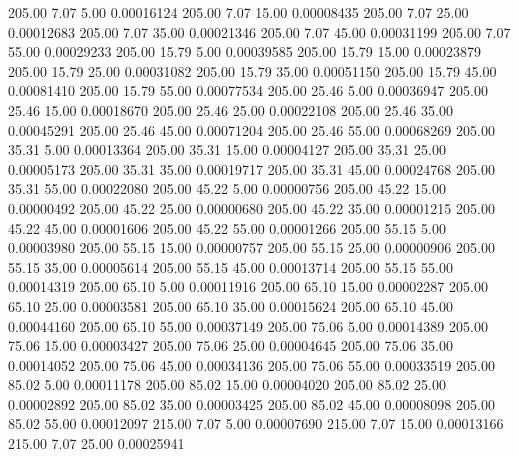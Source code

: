     205.00      7.07      5.00     0.00016124
    205.00      7.07     15.00     0.00008435
    205.00      7.07     25.00     0.00012683
    205.00      7.07     35.00     0.00021346
    205.00      7.07     45.00     0.00031199
    205.00      7.07     55.00     0.00029233
    205.00     15.79      5.00     0.00039585
    205.00     15.79     15.00     0.00023879
    205.00     15.79     25.00     0.00031082
    205.00     15.79     35.00     0.00051150
    205.00     15.79     45.00     0.00081410
    205.00     15.79     55.00     0.00077534
    205.00     25.46      5.00     0.00036947
    205.00     25.46     15.00     0.00018670
    205.00     25.46     25.00     0.00022108
    205.00     25.46     35.00     0.00045291
    205.00     25.46     45.00     0.00071204
    205.00     25.46     55.00     0.00068269
    205.00     35.31      5.00     0.00013364
    205.00     35.31     15.00     0.00004127
    205.00     35.31     25.00     0.00005173
    205.00     35.31     35.00     0.00019717
    205.00     35.31     45.00     0.00024768
    205.00     35.31     55.00     0.00022080
    205.00     45.22      5.00     0.00000756
    205.00     45.22     15.00     0.00000492
    205.00     45.22     25.00     0.00000680
    205.00     45.22     35.00     0.00001215
    205.00     45.22     45.00     0.00001606
    205.00     45.22     55.00     0.00001266
    205.00     55.15      5.00     0.00003980
    205.00     55.15     15.00     0.00000757
    205.00     55.15     25.00     0.00000906
    205.00     55.15     35.00     0.00005614
    205.00     55.15     45.00     0.00013714
    205.00     55.15     55.00     0.00014319
    205.00     65.10      5.00     0.00011916
    205.00     65.10     15.00     0.00002287
    205.00     65.10     25.00     0.00003581
    205.00     65.10     35.00     0.00015624
    205.00     65.10     45.00     0.00044160
    205.00     65.10     55.00     0.00037149
    205.00     75.06      5.00     0.00014389
    205.00     75.06     15.00     0.00003427
    205.00     75.06     25.00     0.00004645
    205.00     75.06     35.00     0.00014052
    205.00     75.06     45.00     0.00034136
    205.00     75.06     55.00     0.00033519
    205.00     85.02      5.00     0.00011178
    205.00     85.02     15.00     0.00004020
    205.00     85.02     25.00     0.00002892
    205.00     85.02     35.00     0.00003425
    205.00     85.02     45.00     0.00008098
    205.00     85.02     55.00     0.00012097
    215.00      7.07      5.00     0.00007690
    215.00      7.07     15.00     0.00013166
    215.00      7.07     25.00     0.00025941

